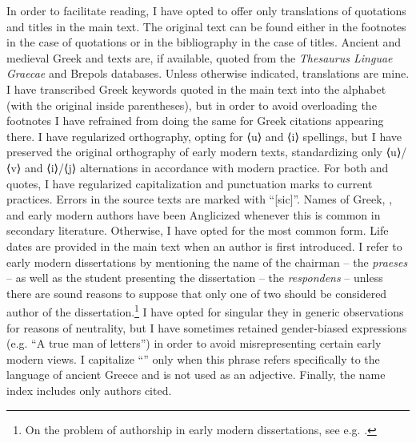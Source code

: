\hypertarget{Toc19704800}{}
In order to facilitate reading, I have opted to offer only  translations of quotations and titles in the main text. The original text can be found either in the footnotes in the case of quotations or in the bibliography in the case of titles. Ancient and medieval Greek and  texts are, if available, quoted from the \textit{Thesaurus Linguae Graecae} and Brepols databases. Unless otherwise indicated, translations are mine. I have transcribed Greek keywords quoted in the main text into the  alphabet (with the original inside parentheses), but in order to avoid overloading the footnotes I have refrained from doing the same for Greek citations appearing there. I have regularized  orthography, opting for ⟨u⟩ and ⟨i⟩ spellings, but I have preserved the original orthography of early modern  texts, standardizing only ⟨u⟩/⟨v⟩ and ⟨i⟩/⟨j⟩ alternations in accordance with modern practice. For both  and  quotes, I have regularized capitalization and punctuation marks to current practices. Errors in the source texts are marked with “[sic]”. Names of Greek, , and early modern authors have been Anglicized whenever this is common in secondary literature. Otherwise, I have opted for the most common form. Life dates are provided in the main text when an author is first introduced. I refer to early modern dissertations by mentioning the name of the chairman – the \textit{praeses} – as well as the student presenting the dissertation – the \textit{respondens} – unless there are sound reasons to suppose that only one of two should be considered author of the dissertation.\footnote{On the problem of authorship in early modern dissertations, see e.g. \citet{Considine2008b}.} I have opted for singular they in generic observations for reasons of neutrality, but I have sometimes retained gender-biased expressions (e.g. “A true man of letters”) in order to avoid misrepresenting certain early modern views. I capitalize “” only when this phrase refers specifically to the language of ancient Greece and is not used as an adjective. Finally, the name index includes only authors cited.

